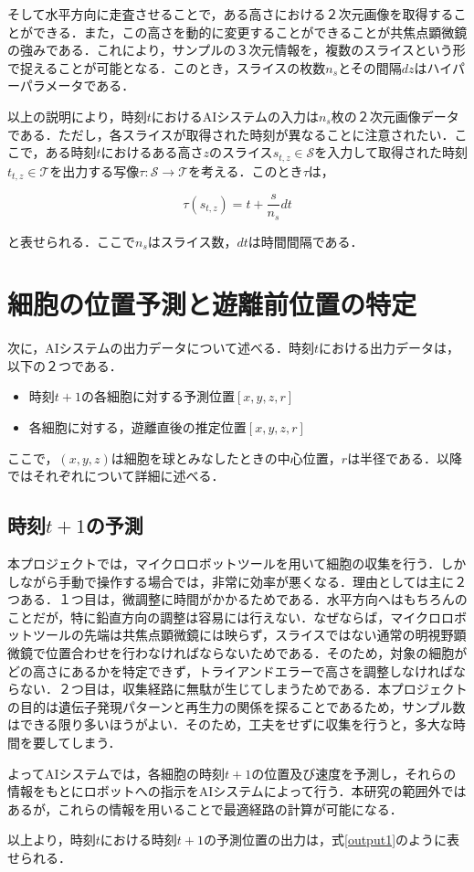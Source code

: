 そして水平方向に走査させることで，ある高さにおける２次元画像を取得することができる．また，この高さを動的に変更することができることが共焦点顕微鏡の強みである．これにより，サンプルの３次元情報を，複数のスライスという形で捉えることが可能となる．このとき，スライスの枚数$n_s$とその間隔$dz$はハイパーパラメータである．
\par
以上の説明により，時刻$t$におけるAIシステムの入力は$n_s$枚の２次元画像データである．ただし，各スライスが取得された時刻が異なることに注意されたい．ここで，ある時刻$t$におけるある高さ$z$のスライス$s_{t,z} \in \mathcal{S}$を入力して取得された時刻$t_{t,z} \in \mathcal{T}$を出力する写像$\tau:\mathcal{S} \rightarrow \mathcal{T}$を考える．このとき$\tau$は，

\begin{equation}
    \tau(s_{t,z}) = t + \frac{s}{n_s} dt
    \label{eq:slice-time}
\end{equation}

と表せられる．ここで$n_s$はスライス数，$dt$は時間間隔である．

\section{細胞の位置予測と遊離前位置の特定}
次に，AIシステムの出力データについて述べる．時刻$t$における出力データは，以下の２つである．
\begin{itemize}
    \item 時刻$t+1$の各細胞に対する予測位置$\left[x, y, z, r\right]$
    \item 各細胞に対する，遊離直後の推定位置$\left[x, y, z, r\right]$
\end{itemize}
ここで，$\left(x,y,z\right)$は細胞を球とみなしたときの中心位置，$r$は半径である．以降ではそれぞれについて詳細に述べる．
\subsection{時刻$t+1$の予測}
本プロジェクトでは，マイクロロボットツールを用いて細胞の収集を行う．しかしながら手動で操作する場合では，非常に効率が悪くなる．理由としては主に２つある．１つ目は，微調整に時間がかかるためである．水平方向へはもちろんのことだが，特に鉛直方向の調整は容易には行えない．なぜならば，マイクロロボットツールの先端は共焦点顕微鏡には映らず，スライスではない通常の明視野顕微鏡で位置合わせを行わなければならないためである．そのため，対象の細胞がどの高さにあるかを特定できず，トライアンドエラーで高さを調整しなければならない．２つ目は，収集経路に無駄が生じてしまうためである．本プロジェクトの目的は遺伝子発現パターンと再生力の関係を探ることであるため，サンプル数はできる限り多いほうがよい．そのため，工夫をせずに収集を行うと，多大な時間を要してしまう．
\par
よってAIシステムでは，各細胞の時刻$t+1$の位置及び速度を予測し，それらの情報をもとにロボットへの指示をAIシステムによって行う．本研究の範囲外ではあるが，これらの情報を用いることで最適経路の計算が可能になる．
\par
以上より，時刻$t$における時刻$t+1$の予測位置の出力は，式\eqref{output1}のように表せられる．

